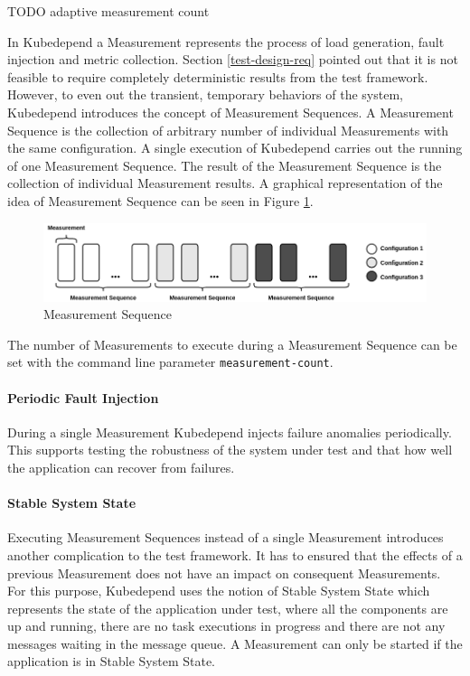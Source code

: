 TODO adaptive measurement count

In Kubedepend a Measurement represents the process of load generation, fault injection and metric collection. Section \ref{test-design-req} pointed out that it is not feasible to require completely deterministic results from the test framework. However, to even out the transient, temporary behaviors of the system, Kubedepend introduces the concept of Measurement Sequences. A Measurement Sequence is the collection of arbitrary number of individual Measurements with the same configuration. A single execution of Kubedepend carries out the running of one Measurement Sequence. The result of the Measurement Sequence is the collection of individual Measurement results. A graphical representation of the idea of Measurement Sequence can be seen in Figure \ref{fig:measurement_sequence}.

\begin{figure}[h]
	\centering
	\includegraphics[width=140mm, keepaspectratio]{figures/measurement_sequence.png}
	\caption{Measurement Sequence}
	\label{fig:measurement_sequence}
\end{figure}

The number of Measurements to execute during a Measurement Sequence can be set with the command line parameter \texttt{measurement-count}.




\paragraph{Periodic Fault Injection} During a single Measurement Kubedepend injects failure anomalies periodically. This supports testing the robustness of the system under test and that how well the application can recover from failures.

\paragraph{Stable System State} Executing Measurement Sequences instead of a single Measurement introduces another complication to the test framework. It has to ensured that the effects of a previous Measurement does not have an impact on consequent Measurements. For this purpose, Kubedepend uses the notion of Stable System State which represents the state of the application under test, where all the components are up and running, there are no task executions in progress and there are not any messages waiting in the message queue. A Measurement can only be started if the application is in Stable System State.

